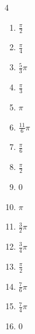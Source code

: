 \begin{multicols}{4}
\begin{enumerate}
  \item $\displaystyle \frac{\pi}{2}$

  \item $\displaystyle \frac{\pi}{4}$

  \item $\displaystyle \frac{5}{3}\pi$

  \item $\displaystyle \frac{\pi}{3}$

  \item $\displaystyle \pi$

  \item $\displaystyle \frac{11}{6}\pi$

  \item $\displaystyle \frac{\pi}{6}$

  \item $\displaystyle \frac{\pi}{2}$

  \item $\displaystyle 0$

  \item $\displaystyle \pi$

  \item $\displaystyle \frac{3}{2}\pi$

  \item $\displaystyle \frac{3}{4}\pi$

  \item $\displaystyle \frac{\pi}{2}$

  \item $\displaystyle \frac{7}{6}\pi$

  \item $\displaystyle \frac{7}{4}\pi$

  \item $\displaystyle 0$


\end{enumerate}
\end{multicols}
